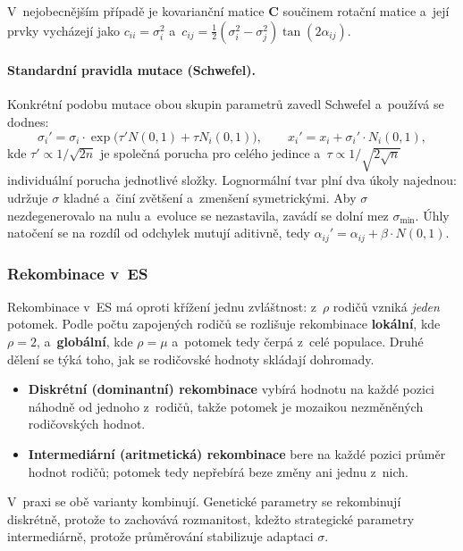 \documentclass[11pt,a4paper]{article}
\theoremstyle{definition}
\begin{document}
V~nejobecnějším případě je kovarianční matice $\mathbf{C}$ součinem rotační matice a~její
prvky vycházejí jako $c_{ii} = \sigma_i^2$ a~$c_{ij} = \tfrac12(\sigma_i^2 -
\sigma_j^2)\tan(2\alpha_{ij})$.

\paragraph{Standardní pravidla mutace (Schwefel).} Konkrétní podobu mutace obou skupin
parametrů zavedl Schwefel a~používá se dodnes:
\[
\sigma_i' = \sigma_i \cdot \exp\big(\tau' N(0,1) + \tau N_i(0,1)\big),
\qquad
x_i' = x_i + \sigma_i' \cdot N_i(0,1),
\]
kde $\tau' \propto 1/\sqrt{2n}$ je společná porucha pro celého jedince a~$\tau \propto
1/\sqrt{2\sqrt{n}}$ individuální porucha jednotlivé složky. Lognormální tvar plní dva úkoly
najednou: udržuje $\sigma$ kladné a~činí zvětšení a~zmenšení symetrickými. Aby $\sigma$
nezdegenerovalo na nulu a~evoluce se nezastavila, zavádí se dolní mez $\sigma_{\min}$. Úhly
natočení se na rozdíl od odchylek mutují aditivně, tedy
$\alpha_{ij}' = \alpha_{ij} + \beta \cdot N(0,1)$.

\subsubsection{Rekombinace v~ES}

Rekombinace v~ES má oproti křížení jednu zvláštnost: z~$\rho$ rodičů vzniká \emph{jeden}
potomek. Podle počtu zapojených rodičů se rozlišuje rekombinace \textbf{lokální}, kde
$\rho = 2$, a~\textbf{globální}, kde $\rho = \mu$ a~potomek tedy čerpá z~celé populace.
Druhé dělení se týká toho, jak se rodičovské hodnoty skládají dohromady.

\begin{itemize}
\item \textbf{Diskrétní (dominantní) rekombinace} vybírá hodnotu na každé pozici náhodně od
  jednoho z~rodičů, takže potomek je mozaikou nezměněných rodičovských hodnot.
\item \textbf{Intermediární (aritmetická) rekombinace} bere na každé pozici průměr hodnot
  rodičů; potomek tedy nepřebírá beze změny ani jednu z~nich.
\end{itemize}
V~praxi se obě varianty kombinují. Genetické parametry se rekombinují diskrétně, protože to
zachovává rozmanitost, kdežto strategické parametry intermediárně, protože průměrování
stabilizuje adaptaci $\sigma$.
\end{document}
